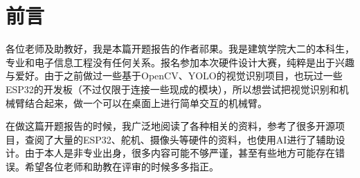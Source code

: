 \section*{前言}

各位老师及助教好，我是本篇开题报告的作者祁果。我是建筑学院大二的本科生，专业和电子信息工程没有任何关系。报名参加本次硬件设计大赛，纯粹是出于兴趣与爱好。由于之前做过一些基于OpenCV、YOLO的视觉识别项目，也玩过一些ESP32的开发板（不过仅限于连接一些现成的模块），所以想尝试把视觉识别和机械臂结合起来，做一个可以在桌面上进行简单交互的机械臂。

在做这篇开题报告的时候，我广泛地阅读了各种相关的资料，参考了很多开源项目，查阅了大量的ESP32、舵机、摄像头等硬件的资料，也使用AI进行了辅助设计。由于本人是非专业出身，很多内容可能不够严谨，甚至有些地方可能存在错误。希望各位老师和助教在评审的时候多多指正。